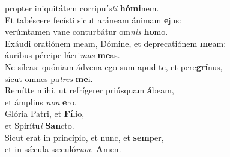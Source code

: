 \evenverse propter iniquitátem corripuí\textit{sti} \textbf{hó}\textbf{mi}nem.\\
\oddverse Et tabéscere fecísti sicut aráneam ánimam \textbf{e}jus:~\*\\
\oddverse verúmtamen vane conturbátur om\textit{nis} \textbf{ho}mo.\\
\evenverse Exáudi oratiónem meam, Dómine, et deprecatiónem \textbf{me}am:~\*\\
\evenverse áuribus pércipe lácri\textit{mas} \textbf{me}as.\\
\oddverse Ne síleas: quóniam ádvena ego sum apud te, et pere\textbf{grí}nus,~\*\\
\oddverse sicut omnes pa\textit{tres} \textbf{me}i.\\
\evenverse Remítte mihi, ut refrígerer priúsquam \textbf{á}beam,~\*\\
\evenverse et ámplius \textit{non} \textbf{e}ro.\\
\oddverse Glória Patri, et \textbf{Fí}lio,~\*\\
\oddverse et Spirítu\textit{i} \textbf{San}cto.\\
\evenverse Sicut erat in princípio, et nunc, et \textbf{sem}per,~\*\\
\evenverse et in sǽcula sæculó\textit{rum}. \textbf{A}men.\\
